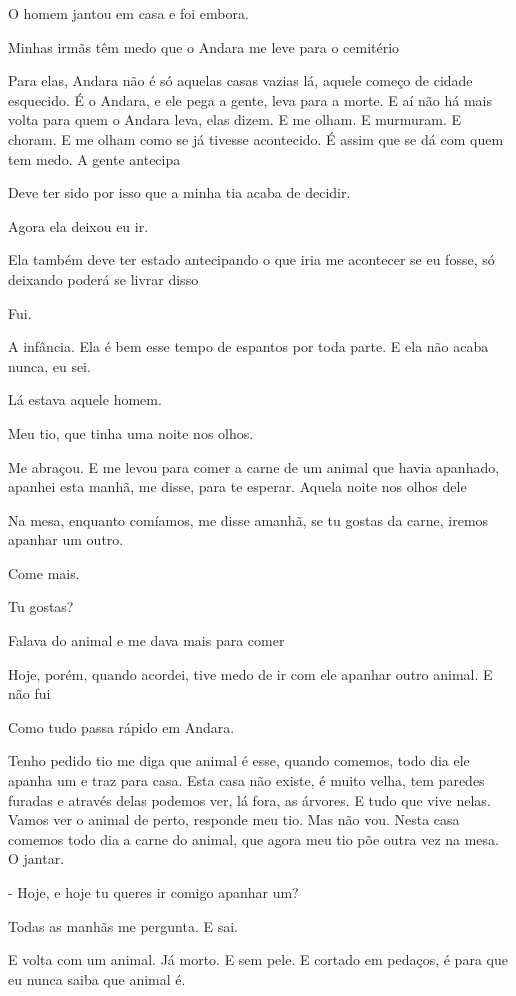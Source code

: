 O homem jantou em casa e foi embora.

Minhas irmãs têm medo que o Andara me leve para o cemitério

Para elas, Andara não é só aquelas casas vazias lá, aquele começo de
cidade esquecido. É o Andara, e ele pega a gente, leva para a morte. E
aí não há mais volta para quem o Andara leva, elas dizem. E me olham. E
murmuram. E choram. E me olham como se já tivesse acontecido. É assim
que se dá com quem tem medo. A gente antecipa

Deve ter sido por isso que a minha tia acaba de decidir.

Agora ela deixou eu ir.

Ela também deve ter estado antecipando o que iria me acontecer se eu
fosse, só deixando poderá se livrar disso

Fui.

A infância. Ela é bem esse tempo de espantos por toda parte. E ela não
acaba nunca, eu sei.

Lá estava aquele homem.

Meu tio, que tinha uma noite nos olhos.

Me abraçou. E me levou para comer a carne de um animal que havia
apanhado, apanhei esta manhã, me disse, para te esperar. Aquela noite
nos olhos dele

Na mesa, enquanto comíamos, me disse amanhã, se tu gostas da carne,
iremos apanhar um outro.

Come mais.

Tu gostas?

Falava do animal e me dava mais para comer

Hoje, porém, quando acordei, tive medo de ir com ele apanhar outro
animal. E não fui

Como tudo passa rápido em Andara.

Tenho pedido tio me diga que animal é esse, quando comemos, todo dia ele
apanha um e traz para casa. Esta casa não existe, é muito velha, tem
paredes furadas e através delas podemos ver, lá fora, as árvores. E tudo
que vive nelas. Vamos ver o animal de perto, responde meu tio. Mas não
vou. Nesta casa comemos todo dia a carne do animal, que agora meu tio
põe outra vez na mesa. O jantar.

- Hoje, e hoje tu queres ir comigo apanhar um?

Todas as manhãs me pergunta. E sai.

E volta com um animal. Já morto. E sem pele. E cortado em pedaços, é
para que eu nunca saiba que animal é.

